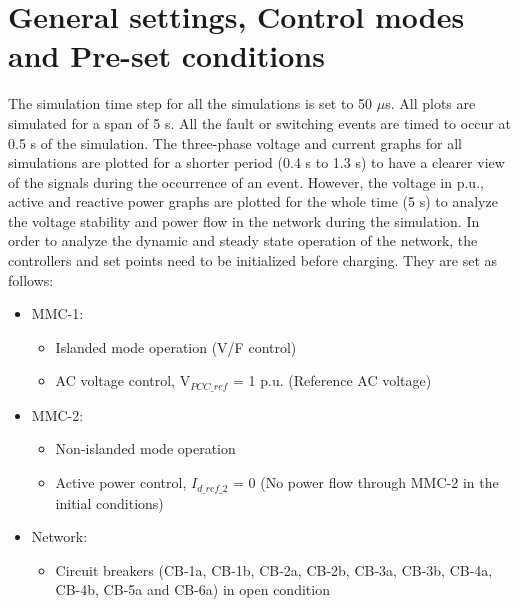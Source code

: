 \section{General settings, Control modes and Pre-set conditions}
The simulation time step for all the simulations is set to 50 $\mu$s. All plots are simulated for a span of 5 s. All the fault or switching events are timed to occur at 0.5 s of the simulation. The three-phase voltage and current graphs for all simulations are plotted for a shorter period (0.4 s to 1.3 s) to have a clearer view of the signals during the occurrence of an event. However, the voltage in p.u., active and reactive power graphs are plotted for the whole time (5 s) to analyze the voltage stability and power flow in the network during the simulation. In order to analyze the dynamic and steady state operation of the network, the controllers and set points need to be initialized before charging. They are set as follows:

\begin{itemize}
    \item \gls{MMC}-1:
    \begin{itemize}
        \item Islanded mode operation (V/F control)
        \item \gls{AC} voltage control, V$_{PCC\_{ref}}$ = 1 p.u. (Reference \gls{AC} voltage)
    \end{itemize}
\end{itemize}

\begin{itemize}
    \item \gls{MMC}-2:
    \begin{itemize}
        \item Non-islanded mode operation
        \item Active power control, $I_{d\_ref\_2}$ = 0 (No power flow through \gls{MMC}-2 in the initial conditions)
    \end{itemize}
\end{itemize}

\begin{itemize}
    \item Network:
    \begin{itemize}
        \item Circuit breakers (CB-1a, CB-1b, CB-2a, CB-2b, CB-3a, CB-3b, CB-4a, CB-4b, CB-5a and CB-6a) in open condition
    \end{itemize}
\end{itemize}

